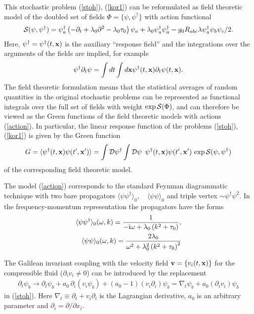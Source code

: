 \documentclass[12pt]{article}
\def\S{{\cal S}}
\def\bfx{{\bf x}}
\begin{document}
This stochastic problem (\ref{stoh}), (\ref{kor1}) can be
reformulated as field theoretic model of the
doubled set of fields $\Phi = \{\psi,\psi^{\dag}\}$ with action functional
\begin{eqnarray}
\S(\psi,\psi^{\dag}) =  \psi_{a}^{\dag}
\left(-\partial_{t}+\lambda_{0} \partial^{2}- \lambda_{0}\tau_{0}\right)
\psi_{a} + \lambda_{0} \psi_{a}^{\dagger}\psi_{a}^{\dagger} - g_{0}R_{abc}\lambda \psi^{\dag}_{a}\psi_{b}\psi_{c}/2.
\label{action}
\end{eqnarray}
Here, $\psi^{\dag}=\psi^{\dag}(t,{\bf x})$ is the auxiliary ``response
field'' and the integrations over the arguments of the fields are implied,
for example
\[  \psi^{\dag}\partial_{t}\psi = \int dt \int d{\bf x}
\psi^{\dag}(t,{\bf x})\partial_{t}\psi(t,{\bf x}). \]
The field theoretic formulation means that the statistical averages
of random quantities in the original stochastic problems can be represented
as functional integrals over the full set of fields with weight
$\exp {\cal S}(\Phi)$, and can therefore be viewed as the Green functions
of the field theoretic models with actions (\ref{action}).
In particular, the linear response function of the problems
(\ref{stoh}), (\ref{kor1}) is given by the Green function
\begin{eqnarray}
G=\langle \psi^{\dag}(t, {\bf x}) \psi(t', {\bf x'} ) \rangle =
\int {\cal D}\psi^{\dag} \int {\cal D} \psi\ \,
\psi^{\dag}(t, {\bf x}) \psi(t', {\bf x'})\, \exp {\cal S}(\psi,\psi^{\dag})
\label{respd}
\end{eqnarray}
of the corresponding field theoretic model.

The model (\ref{action}) corresponds to the standard Feynman
diagrammatic technique with two bare propagators
$\langle \psi \psi^{\dag} \rangle_{0}, \quad \langle \psi \psi \rangle_{0}$ and  triple vertex
$\sim \psi^{\dagger}\psi^2$.
In the frequency-momentum representation the propagators
have the forms
\begin{eqnarray}
\langle \psi \psi^{\dag} \rangle_{0} (\omega,k) =
\frac{1}{-{\rm i}\omega+\lambda_{0} \left(k^{2}+\tau_{0}\right)}, \nonumber \\
\langle \psi \psi \rangle_{0}(\omega,k) =
\frac{2\lambda_{0}}{\omega^2+\lambda_{0}^2 \left(k^{2}+\tau_{0}\right)^2}
\label{lines}
\end{eqnarray}


The Galilean invariant coupling with the velocity field
${\bf v}= \{ v_{i}(t,\bfx) \}$ for the compressible fluid
($\partial _i v_{i} \ne 0$) can be introduced by the replacement
\begin{eqnarray}
\partial_{t}\psi_{b} \to \partial_{t}\psi_{b} + a_{0}\, \partial_{i}(v_{i}\psi_{b}) +
(a_{0}-1) (v_{i} \partial_{i})\psi_{b} =
\nabla_{t} \psi_{b} + a_{0}(\partial_{i}v_{i}) \psi_{b}
\label{nabla}
\end{eqnarray}
in (\ref{stoh}). Here $\nabla_{t} \equiv \partial_{t} + v_{i} \partial_{i}$
is the Lagrangian derivative, $a_{0}$ is an arbitrary parameter and
$\partial_i = \partial /\partial x_{i}$. 
\end{document}
